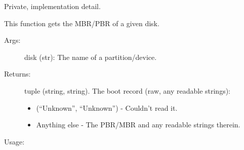 \documentclass[letterpaper,10pt,english]{sphinxmanual}
\begin{document}
\begin{fulllineitems}
\label{\detokenize{linux:getdevinfo.linux.get_boot_record}}
Private, implementation detail.

This function gets the MBR/PBR of a given disk.
\begin{description}
\item[{Args:}] \leavevmode
disk (str):   The name of a partition/device.

\item[{Returns:}] \leavevmode
tuple (string, string). The boot record (raw, any readable strings):
\begin{itemize}
\item {} 
(“Unknown”, “Unknown”)     - Couldn’t read it.

\item {} 
Anything else              - The PBR/MBR and any readable strings therein.

\end{itemize}

\end{description}

Usage:

\begin{sphinxVerbatim}[commandchars=\\\{\}]
   
\end{sphinxVerbatim}

\end{fulllineitems}

\end{document}
